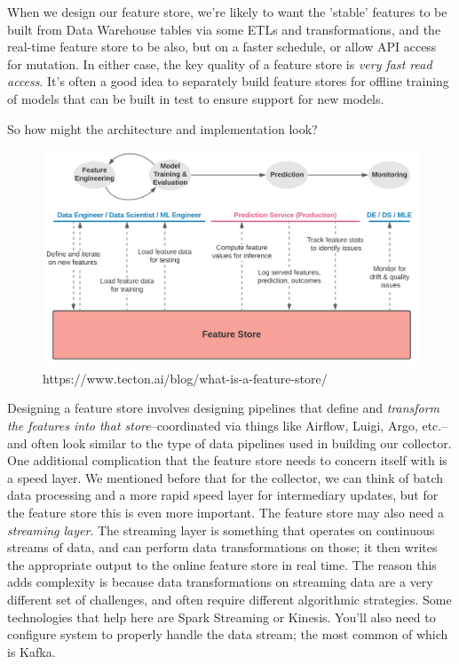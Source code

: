 When we design our feature store, we're likely to want the 'stable' features to be built from Data Warehouse tables via some ETLs and transformations, and the real-time feature store to be also, but on a faster schedule, or allow API access for mutation. In either case, the key quality of a feature store is \emph{very fast read access}. It's often a good idea to separately build feature stores for offline training of models that can be built in test to ensure support for new models.

So how might the architecture and implementation look?

\begin{figure}[h!]
    \caption{https://www.tecton.ai/blog/what-is-a-feature-store/}
    \includegraphics[width=\textwidth-10pt]{book-text/feature-store.png}
\end{figure}

Designing a feature store involves designing pipelines that define and \emph{transform the features into that store}–coordinated via things like Airflow, Luigi, Argo, etc.–and often look similar to the type of data pipelines used in building our collector. One additional complication that the feature store needs to concern itself with is a speed layer. We mentioned before that for the collector, we can think of batch data processing and a more rapid speed layer for intermediary updates, but for the feature store this is even more important. The feature store may also need a \emph{streaming layer}. The streaming layer is something that operates on continuous streams of data, and can perform data transformations on those; it then writes the appropriate output to the online feature store in real time. The reason this adds complexity is because data transformations on streaming data are a very different set of challenges, and often require different algorithmic strategies. Some technologies that help here are Spark Streaming or Kinesis. You'll also need to configure system to properly handle the data stream; the most common of which is Kafka.

